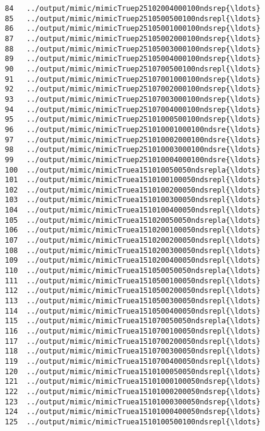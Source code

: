\documentclass[11pt]{article}
\begin{document}
\begin{Verbatim}[commandchars=\\\{\}]
84   ../output/mimic/mimicTruep25102004000100ndsrep{\ldots}  
85   ../output/mimic/mimicTruep2510500500100ndsrepl{\ldots}  
86   ../output/mimic/mimicTruep25105001000100ndsrep{\ldots}  
87   ../output/mimic/mimicTruep25105002000100ndsrep{\ldots}  
88   ../output/mimic/mimicTruep25105003000100ndsrep{\ldots}  
89   ../output/mimic/mimicTruep25105004000100ndsrep{\ldots}  
90   ../output/mimic/mimicTruep2510700500100ndsrepl{\ldots}  
91   ../output/mimic/mimicTruep25107001000100ndsrep{\ldots}  
92   ../output/mimic/mimicTruep25107002000100ndsrep{\ldots}  
93   ../output/mimic/mimicTruep25107003000100ndsrep{\ldots}  
94   ../output/mimic/mimicTruep25107004000100ndsrep{\ldots}  
95   ../output/mimic/mimicTruep25101000500100ndsrep{\ldots}  
96   ../output/mimic/mimicTruep251010001000100ndsre{\ldots}  
97   ../output/mimic/mimicTruep251010002000100ndsre{\ldots}  
98   ../output/mimic/mimicTruep251010003000100ndsre{\ldots}  
99   ../output/mimic/mimicTruep251010004000100ndsre{\ldots}  
100  ../output/mimic/mimicTruea151010050050ndsrepla{\ldots}  
101  ../output/mimic/mimicTruea1510100100050ndsrepl{\ldots}  
102  ../output/mimic/mimicTruea1510100200050ndsrepl{\ldots}  
103  ../output/mimic/mimicTruea1510100300050ndsrepl{\ldots}  
104  ../output/mimic/mimicTruea1510100400050ndsrepl{\ldots}  
105  ../output/mimic/mimicTruea151020050050ndsrepla{\ldots}  
106  ../output/mimic/mimicTruea1510200100050ndsrepl{\ldots}  
107  ../output/mimic/mimicTruea1510200200050ndsrepl{\ldots}  
108  ../output/mimic/mimicTruea1510200300050ndsrepl{\ldots}  
109  ../output/mimic/mimicTruea1510200400050ndsrepl{\ldots}  
110  ../output/mimic/mimicTruea151050050050ndsrepla{\ldots}  
111  ../output/mimic/mimicTruea1510500100050ndsrepl{\ldots}  
112  ../output/mimic/mimicTruea1510500200050ndsrepl{\ldots}  
113  ../output/mimic/mimicTruea1510500300050ndsrepl{\ldots}  
114  ../output/mimic/mimicTruea1510500400050ndsrepl{\ldots}  
115  ../output/mimic/mimicTruea151070050050ndsrepla{\ldots}  
116  ../output/mimic/mimicTruea1510700100050ndsrepl{\ldots}  
117  ../output/mimic/mimicTruea1510700200050ndsrepl{\ldots}  
118  ../output/mimic/mimicTruea1510700300050ndsrepl{\ldots}  
119  ../output/mimic/mimicTruea1510700400050ndsrepl{\ldots}  
120  ../output/mimic/mimicTruea1510100050050ndsrepl{\ldots}  
121  ../output/mimic/mimicTruea15101000100050ndsrep{\ldots}  
122  ../output/mimic/mimicTruea15101000200050ndsrep{\ldots}  
123  ../output/mimic/mimicTruea15101000300050ndsrep{\ldots}  
124  ../output/mimic/mimicTruea15101000400050ndsrep{\ldots}  
125  ../output/mimic/mimicTruea1510100500100ndsrepl{\ldots}  

\end{Verbatim}
\end{document}
